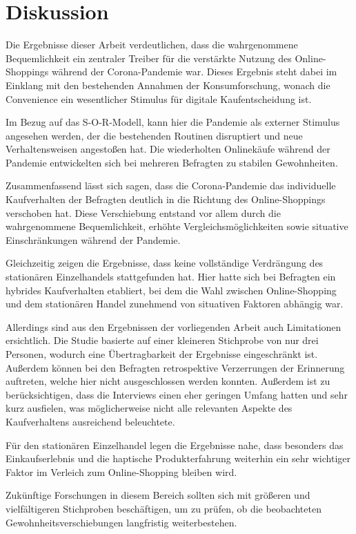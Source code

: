 \section{Diskussion}
Die Ergebnisse dieser Arbeit verdeutlichen, dass die wahrgenommene Bequemlichkeit ein zentraler Treiber für die verstärkte Nutzung des Online-Shoppings während der Corona-Pandemie war. Dieses Ergebnis steht dabei im Einklang mit den bestehenden Annahmen der Konsumforschung, wonach die Convenience ein wesentlicher Stimulus für digitale Kaufentscheidung ist.

Im Bezug auf das S-O-R-Modell, kann hier die Pandemie als externer Stimulus angesehen werden, der die bestehenden Routinen disruptiert und neue Verhaltensweisen angestoßen hat. Die wiederholten Onlinekäufe während der Pandemie entwickelten sich bei mehreren Befragten zu stabilen Gewohnheiten.

Zusammenfassend lässt sich sagen, dass die Corona-Pandemie das individuelle Kaufverhalten der Befragten deutlich in die Richtung des Online-Shoppings verschoben hat. Diese Verschiebung entstand vor allem durch die wahrgenommene Bequemlichkeit, erhöhte Vergleichsmöglichkeiten sowie situative Einschränkungen während der Pandemie.

Gleichzeitig zeigen die Ergebnisse, dass keine vollständige Verdrängung des stationären Einzelhandels stattgefunden hat. Hier hatte sich bei Befragten ein hybrides Kaufverhalten etabliert, bei dem die Wahl zwischen Online-Shopping und dem stationären Handel zunehmend von situativen Faktoren abhängig war.

Allerdings sind aus den Ergebnissen der vorliegenden Arbeit auch Limitationen ersichtlich. Die Studie basierte auf einer kleineren Stichprobe von nur drei Personen, wodurch eine Übertragbarkeit der Ergebnisse eingeschränkt ist. Außerdem können bei den Befragten retrospektive Verzerrungen der Erinnerung auftreten, welche hier nicht ausgeschlossen werden konnten. Außerdem ist zu berücksichtigen, dass die Interviews einen eher geringen Umfang hatten und sehr kurz ausfielen, was möglicherweise nicht alle relevanten Aspekte des Kaufverhaltens ausreichend beleuchtete.

Für den stationären Einzelhandel legen die Ergebnisse nahe, dass besonders das Einkaufserlebnis und die haptische Produkterfahrung weiterhin ein sehr wichtiger Faktor im Verleich zum Online-Shopping bleiben wird.

Zukünftige Forschungen in diesem Bereich sollten sich mit größeren und vielfältigeren Stichproben beschäftigen, um zu prüfen, ob die beobachteten Gewohnheitsverschiebungen langfristig weiterbestehen.